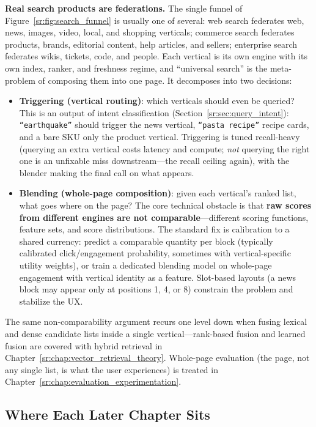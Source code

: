 \textbf{Real search products are federations.} The single funnel of Figure~\ref{sr:fig:search_funnel} is usually one of several: web search federates web, news, images, video, local, and shopping verticals; commerce search federates products, brands, editorial content, help articles, and sellers; enterprise search federates wikis, tickets, code, and people. Each vertical is its own engine with its own index, ranker, and freshness regime, and ``universal search'' is the meta-problem of composing them into one page. It decomposes into two decisions:

\begin{itemize}
    \item \textbf{Triggering (vertical routing)}: which verticals should even be queried? This is an output of intent classification (Section~\ref{sr:sec:query_intent}): \texttt{``earthquake''} should trigger the news vertical, \texttt{``pasta recipe''} recipe cards, and a bare SKU only the product vertical. Triggering is tuned recall-heavy (querying an extra vertical costs latency and compute; \textit{not} querying the right one is an unfixable miss downstream---the recall ceiling again), with the blender making the final call on what appears.
    \item \textbf{Blending (whole-page composition)}: given each vertical's ranked list, what goes where on the page? The core technical obstacle is that \textbf{raw scores from different engines are not comparable}---different scoring functions, feature sets, and score distributions. The standard fix is calibration to a shared currency: predict a comparable quantity per block (typically calibrated click/engagement probability, sometimes with vertical-specific utility weights), or train a dedicated blending model on whole-page engagement with vertical identity as a feature. Slot-based layouts (a news block may appear only at positions 1, 4, or 8) constrain the problem and stabilize the UX.
\end{itemize}

The same non-comparability argument recurs one level down when fusing lexical and dense candidate lists inside a single vertical---rank-based fusion and learned fusion are covered with hybrid retrieval in Chapter~\ref{sr:chap:vector_retrieval_theory}. Whole-page evaluation (the page, not any single list, is what the user experiences) is treated in Chapter~\ref{sr:chap:evaluation_experimentation}.

\subsection{Where Each Later Chapter Sits}

